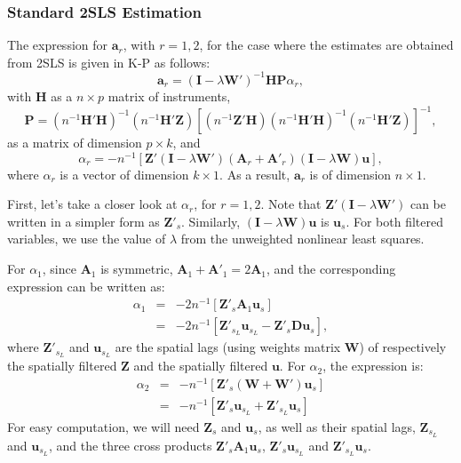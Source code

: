 \documentclass{article}
\begin{document}
\subsubsection{Standard 2SLS Estimation}\label{ss:weightsstandard}
The expression for $\mathbf{a}_r$, with $r = 1,2$, for the case where the estimates
are obtained from 2SLS is given in K-P as follows:
\begin{equation}\label{eq:arstandard}
\mathbf{a}_r = (\mathbf{I} - \lambda \mathbf{W'} )^{-1} \mathbf{HP} \alpha_r,
\end{equation}
with $\mathbf{H}$ as a $n \times p$ matrix of instruments, 
\begin{equation}\label{eq:Pstandard}
\mathbf{P} = (n^{-1}\mathbf{H'H})^{-1} ( n^{-1} \mathbf{H'Z} ) 
        [ (n^{-1} \mathbf{Z'H} ) (n^{-1} \mathbf{H'H} )^{-1} (n^{-1} \mathbf{H'Z}) ]^{-1},
\end{equation}
as a matrix of dimension $p \times k$, and
\begin{equation*}
\alpha_r = - n^{-1} [ \mathbf{Z'} (\mathbf{I} - \lambda \mathbf{W'}) (\mathbf{A}_r + \mathbf{A'}_r) 
 ( \mathbf{I} - \lambda \mathbf{W} ) \mathbf{u} ],
\end{equation*}
where $\alpha_r$ is a vector of dimension $k \times 1$. As a result, $\mathbf{a}_r$ is of
dimension $n \times 1$.

First, let's take a closer look at $\alpha_r$, for $r = 1,2$. Note that $\mathbf{Z'} (\mathbf{I} - \lambda \mathbf{W'})$ can be written in a simpler form as $\mathbf{Z'}_s$. Similarly, 
$ ( \mathbf{I} - \lambda \mathbf{W} ) \mathbf{u}$ is $\mathbf{u}_s$. For both filtered variables,
we use the value of $\lambda$ from the unweighted nonlinear least squares.

For $\alpha_1$, since $\mathbf{A}_1$ is symmetric, $\mathbf{A}_1 + \mathbf{A'}_1 = 2 \mathbf{A}_1$, and the corresponding expression can be written as:
\begin{eqnarray*}
\alpha_1 &=& - 2 n^{-1} [ \mathbf{Z'}_s \mathbf{A}_1 \mathbf{u}_s ]\\
    &=& -2 n^{-1} [ \mathbf{Z'}_{s_L} \mathbf{u}_{s_L} - \mathbf{Z'}_s \mathbf{D} \mathbf{u}_s ],
\end{eqnarray*}
where $\mathbf{Z'}_{s_L}$ and $\mathbf{u}_{s_L}$ are the spatial lags (using weights
matrix $\mathbf{W}$) of respectively the spatially filtered $\mathbf{Z}$ and the spatially
filtered $\mathbf{u}$. For $\alpha_2$, the expression is:
\begin{eqnarray*}
 \alpha_2 &=& - n^{-1} [ \mathbf{Z'}_s (\mathbf{W} + \mathbf{W'} ) \mathbf{u}_s ] \\
    &=& - n^{-1} [ \mathbf{Z'}_s \mathbf{u}_{s_L} + \mathbf{Z'}_{s_L} \mathbf{u}_s ]
\end{eqnarray*}
For easy computation, we will need $\mathbf{Z}_s$ and $\mathbf{u}_s$, as well as their
spatial lags, $\mathbf{Z}_{s_L}$ and $\mathbf{u}_{s_L}$, and the three cross products
$ \mathbf{Z'}_s \mathbf{A}_1 \mathbf{u}_s$, $\mathbf{Z'}_s \mathbf{u}_{s_L} $
and $\mathbf{Z'}_{s_L} \mathbf{u}_s$.
\end{document}
